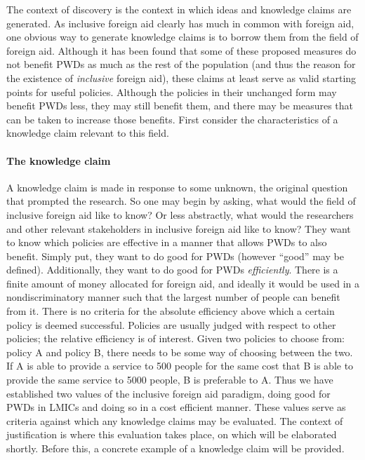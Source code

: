 \documentclass[a4paper]{article}
\begin{document}
The context of discovery is the context in which ideas and knowledge claims
are generated. As inclusive foreign aid clearly has much in common with
foreign aid, one obvious way to generate knowledge claims is to borrow them
from the field of foreign aid. Although it has been found that some of these
proposed measures do not benefit PWDs as much as the rest of the population
(and thus the reason for the existence of \emph{inclusive} foreign aid), these
claims at least serve as valid starting points for useful policies. Although
the policies in their unchanged form may benefit PWDs less, they may still
benefit them, and there may be measures that can be taken to increase those
benefits. First consider the characteristics of a knowledge claim relevant to
this field.


\paragraph{The knowledge claim}

A knowledge claim is made in response to some unknown, the original question
that prompted the research. So one may begin by asking, what would the field
of inclusive foreign aid like to know? Or less abstractly, what would the
researchers and other relevant stakeholders in inclusive foreign aid like to
know? They want to know which policies are effective in a manner that allows
PWDs to also benefit. Simply put, they want to do good for PWDs (however
``good'' may be defined). Additionally, they want to do good for PWDs
\emph{efficiently}. There is a finite amount of money allocated for foreign
aid, and ideally it would be used in a nondiscriminatory manner such that the
largest number of people can benefit from it. There is no criteria for the
absolute efficiency above which a certain policy is deemed successful.
Policies are usually judged with respect to other policies; the relative
efficiency is of interest. Given two policies to choose from: policy A and
policy B, there needs to be some way of choosing between the two. If A is able
to provide a service to 500 people for the same cost that B is able to provide
the same service to 5000 people, B is preferable to A. Thus we have
established two values of the inclusive foreign aid paradigm, doing good for
PWDs in LMICs and doing so in a cost efficient manner. These values serve as
criteria against which any knowledge claims may be evaluated. The context of
justification is where this evaluation takes place, on which will be
elaborated shortly. Before this, a concrete example of a knowledge claim will
be provided.
\end{document}
